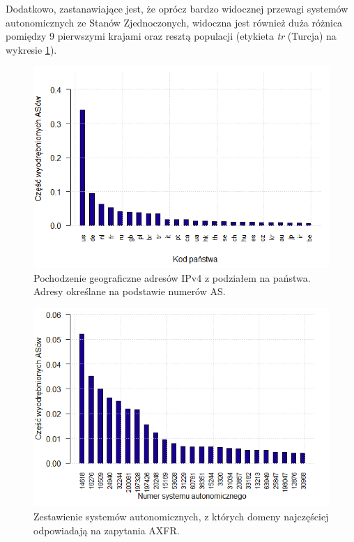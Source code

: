 Dodatkowo, zastanawiające jest, że oprócz bardzo widocznej przewagi systemów autonomicznych ze Stanów Zjednoczonych, widoczna jest
również duża różnica pomiędzy 9 pierwszymi krajami oraz resztą populacji (etykieta \textit{tr} (Turcja) na
wykresie \ref{fig:ipv4_countries}).

\begin{figure}[h]
	\centering
	\includegraphics[width=1.0\textwidth]{image/ipv4_as_countries_no_title}
	\caption{Pochodzenie geograficzne adresów IPv4 z podziałem na państwa. Adresy określane na podstawie numerów AS.}
	\label{fig:ipv4_countries}
\end{figure}

\begin{figure}[h]
	\centering
	\includegraphics[width=1.0\textwidth]{image/asn_all_no_title}
	\caption{Zestawienie systemów autonomicznych, z których domeny najczęściej odpowiadają na zapytania AXFR.}
	\label{fig:asn_all}
\end{figure}

